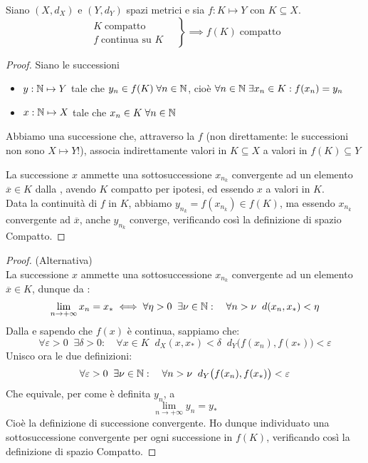 \begin{theorem}
	\label{teo:weier_generale}
	Siano $(X,d_X)$ e $(Y,d_Y)$ spazi metrici e sia $f:K \mapsto Y$ con $K \subseteq X$.
	$$\left.\begin{array}{ll}
		K\;\text{compatto} \\
		f\;\text{continua su } K
		\end{array} \quad\right\} \implies f(K)\;\text{compatto}$$
	\begin{proof}
		Siano le successioni
		\begin{itemize}
			\item $y: \mathbb{N} \mapsto Y$ tale che $y_n \in f(K) \;\forall n \in \mathbb{N}$, cioè $\forall n \in \mathbb{N}\;\exists x_n \in K: f(x_n) = y_n$
			\item $x: \mathbb{N} \mapsto X$ tale che $x_n \in K\;\forall n \in \mathbb{N}$
		\end{itemize}
		\begin{note}
			Abbiamo una successione che, attraverso la $f$ (non direttamente: le successioni non sono $X \mapsto Y$!), associa indirettamente valori in $K \subseteq X$ a valori in $f(K) \subseteq Y$
		\end{note}
		La successione $x$ ammette una sottosuccessione $x_{n_k}$ convergente ad un elemento $\overline{x} \in K$ dalla , avendo $K$ compatto per ipotesi, ed essendo $x$ a valori in $K$.\\
		Data la continuità di $f$ in $K$, abbiamo $y_{n_k} = f(x_{n_k}) \in f(K)$, ma essendo $x_{n_k}$ convergente ad $\overline{x}$, anche $y_{n_k}$ converge, verificando così la definizione di spazio Compatto.
	\end{proof}
	\begin{proof} (Alternativa)\\
		La successione $x$ ammette una sottosuccessione $x_{n_k}$ convergente ad un elemento $\overline{x} \in K$, dunque da :
		$$\lim\limits_{n\rightarrow+\infty}x_n=x_*\iff\forall\eta > 0\;\;\exists\nu\in\mathbb{N}:\quad\forall n>\nu\;\;d(x_n,x_*)<\eta$$
		Dalla  e sapendo che $f(x)$ è continua, sappiamo che:
		$$\forall\varepsilon > 0\;\;\exists\delta > 0:\quad\forall x \in K\;\;d_X (x,x_*)<\delta\;\;d_Y \bigl(f(x_n),f(x_*)\bigr)<\varepsilon$$
		Unisco ora le due definizioni:
		$$\forall \varepsilon > 0\;\;\exists \nu \in \mathbb{N}:\quad \forall n > \nu\;\;d_Y \bigl(f(x_n),f(x_*)\bigr)<\varepsilon$$
		Che equivale, per come è definita $y_n$, a
		$$\lim\limits_{n\rightarrow +\infty}y_n = y_*$$
		Cioè la definizione di successione convergente. Ho dunque individuato una sottosuccessione convergente per ogni successione in $f(K)$, verificando così la definizione di spazio Compatto.
	\end{proof}
\end{theorem}
